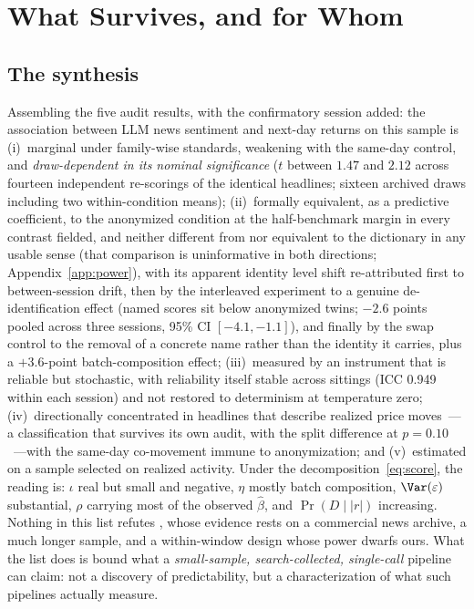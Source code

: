 \section{What Survives, and for Whom}\label{sec:discussion}

\subsection{The synthesis}

Assembling the five audit results, with the confirmatory session added: the association between LLM news sentiment and next-day returns on this sample is (i)~marginal under family-wise standards, weakening with the same-day control, and \emph{draw-dependent in its nominal significance} ($t$ between $1.47$ and $2.12$ across fourteen independent re-scorings of the identical headlines; sixteen archived draws including two within-condition means); (ii)~formally equivalent, as a predictive coefficient, to the anonymized condition at the half-benchmark margin in every contrast fielded, and neither different from nor equivalent to the dictionary in any usable sense (that comparison is uninformative in both directions; Appendix~\ref{app:power}), with its apparent identity level shift re-attributed first to between-session drift, then by the interleaved experiment to a genuine de-identification effect (named scores sit below anonymized twins; $-2.6$ points pooled across three sessions, 95\% CI $[-4.1, -1.1]$), and finally by the swap control to the removal of a concrete name rather than the identity it carries, plus a $+3.6$-point batch-composition effect; (iii)~measured by an instrument that is reliable but stochastic, with reliability itself stable across sittings (ICC 0.949 within each session) and not restored to determinism at temperature zero; (iv)~directionally concentrated in headlines that describe realized price moves~---a classification that survives its own audit, with the split difference at $p=0.10$~---with the same-day co-movement immune to anonymization; and (v)~estimated on a sample selected on realized activity. Under the decomposition~\eqref{eq:score}, the reading is: $\iota$ real but small and negative, $\eta$ mostly batch composition, $\Var(\varepsilon)$ substantial, $\rho$ carrying most of the observed $\hat\beta$, and $\Pr(D\mid |r|)$ increasing. Nothing in this list refutes \citet{lopezlira2026}, whose evidence rests on a commercial news archive, a much longer sample, and a within-window design whose power dwarfs ours. What the list does is bound what a \emph{small-sample, search-collected, single-call} pipeline can claim: not a discovery of predictability, but a characterization of what such pipelines actually measure.

